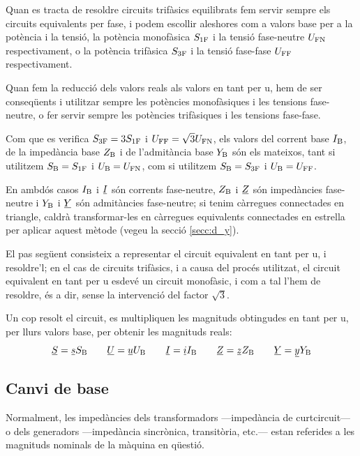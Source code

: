 Quan es tracta de resoldre circuits trifàsics equilibrats fem servir sempre els circuits equivalents per fase, i podem escollir aleshores com a valors base per a la potència i la tensió, la potència monofàsica $S_\mathrm{1F}$ i la tensió fase-neutre $U_\mathrm{FN}$ respectivament, o la potència trifàsica $S_\mathrm{3F}$ i la tensió fase-fase $U_\mathrm{FF}$ respectivament.


 Quan fem la reducció dels valors reals als valors en tant per u, hem de ser conseqüents i utilitzar sempre les potències monofàsiques i les tensions fase-neutre, o fer servir sempre les potències trifàsiques i les tensions fase-fase.

 Com que es verifica $S_\mathrm{3F}=3 S_\mathrm{1F}$ i $U_\mathrm{FF}=\sqrt{3}U_\mathrm{FN}$, els valors  del corrent base $I_\mathrm{B}$, de la impedància base $Z_\mathrm{B}$ i  de l'admitància base $Y_\mathrm{B}$ són els mateixos, tant si utilitzem $S_\mathrm{B}=S_\mathrm{1F}$ i $U_\mathrm{B}=U_\mathrm{FN}$, com si utilitzem $S_\mathrm{B}=S_\mathrm{3F}$ i $U_\mathrm{B}=U_\mathrm{FF}$.

 En ambdós casos $I_\mathrm{B}$ i $\cmplx{I}$ són corrents fase-neutre, $Z_\mathrm{B}$ i $\cmplx{Z}$ són impedàncies  fase-neutre i $Y_\mathrm{B}$ i $\cmplx{Y}$ són admitàncies fase-neutre; si tenim càrregues connectades en triangle, caldrà transformar-les en càrregues equivalents connectades en estrella per aplicar aquest mètode (vegeu la secció \ref{secc:d_y}).

El pas següent consisteix a representar el circuit equivalent en tant
per u, i resoldre'l; en el cas de circuits trifàsics, i a causa del procés utilitzat, el circuit equivalent en tant per u esdevé un circuit monofàsic, i com a tal l'hem de resoldre, és a dir, sense la intervenció del factor $\sqrt{3}$.

Un cop resolt el circuit, es multipliquen les magnituds obtingudes en tant per u, per
llurs valors base, per obtenir les magnituds reals:
\begin{equation}
   \cmplx{S} = \cmplx{s} S\ped{B} \qquad \cmplx{U} = \cmplx{u} U\ped{B} \qquad \cmplx{I} = \cmplx{i} I\ped{B} \qquad \cmplx{Z} = \cmplx{z} Z\ped{B} \qquad \cmplx{Y} = \cmplx{y} Y\ped{B}
\end{equation}

\subsection{Canvi de base}\label{sec:canvi-base} 

Normalment, les impedàncies dels transformadors ---impedància de curtcircuit--- o dels generadors ---impedància sincrònica, transitòria, etc.--- estan referides a les magnituds nominals de la màquina en qüestió.


